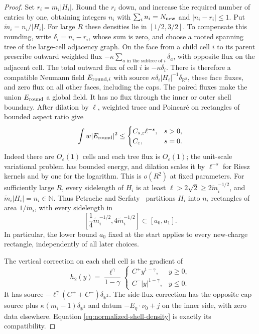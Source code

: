 \begin{proof}
Set $r_i=m_i|H_i|$.  Round the $r_i$ down, and increase the required
number of entries by one, obtaining integers $n_i$ with
$\sum_i n_i=N_{\rm new}$ and $|n_i-r_i|\le1$.
Put $\widetilde m_i=n_i/|H_i|$.  For large $R$ these densities lie
in $[1/2,3/2]$.  To compensate this rounding, write
$\delta_i=n_i-r_i$, whose sum is zero, and choose a rooted spanning
tree of the large-cell adjacency graph.  On the face from a child
cell $i$ to its parent prescribe outward weighted flux
$-\kappa\sum_{a\text{ in the subtree of }i}\delta_a$, with opposite
flux on the adjacent cell.  The total outward flux of cell $i$ is
$-\kappa\delta_i$.  There is therefore a compatible Neumann field
$E_{{\rm round},i}$ with source
$\kappa\delta_i|H_i|^{-1}\delta_{\mathbb R^2}$, these face fluxes,
and zero flux on all other faces, including the caps.
The paired fluxes make the union $E_{\rm round}$ a global field.
It has no flux through the inner or outer shell boundary.
After dilation by $\ell$, weighted trace and Poincar\'e on rectangles
of bounded aspect ratio give
\[
 \int w|E_{\rm round}|^2\le
 \begin{cases}C_{s,\varepsilon}\ell^{-s},&s>0,\\
 C_\varepsilon,&s=0.
 \end{cases}
\]
Indeed there are $O_\varepsilon(1)$ cells and each tree flux is
$O_\varepsilon(1)$; the unit-scale variational problem has bounded
energy, and dilation scales it by $\ell^{-s}$ for Riesz kernels and
by one for the logarithm.  This is $o(R^2)$ at fixed parameters.
For sufficiently large $R$, every sidelength of $H_i$ is at least
$\ell>2\sqrt2\ge2\widetilde m_i^{-1/2}$, and
$\widetilde m_i|H_i|=n_i\in\mathbb N$.
Thus Petrache and Serfaty~\citep[Lemma~6.3]{PetracheSerfaty2017} partitions $H_i$ into
$n_i$ rectangles of area $1/\widetilde m_i$, with every sidelength
in
\[
 \left[\frac14\widetilde m_i^{-1/2},
                      4\widetilde m_i^{-1/2}\right]
                  \subset[a_0,a_1].
\]
In particular, the lower bound $a_0$ fixed at the start applies to
every new-charge rectangle, independently of all later choices.

The vertical correction on each shell cell is the gradient of
\[
 h_2(y)=\frac{\ell^\gamma}{1-\gamma}
 \begin{cases}C^+y^{1-\gamma},&y\ge0,\\
 C^-|y|^{1-\gamma},&y\le0.
 \end{cases}
\]
It has source $-\ell^\gamma(C^++C^-)\delta_{\mathbb R^2}$.
The side-flux correction has the opposite cap source plus
$\kappa(m_i-1)\delta_{\mathbb R^2}$ and datum
$-E_\eta\cdot\nu_0+j$ on the
inner side, with zero data elsewhere.  Equation
\eqref{eq:normalized-shell-density} is exactly its compatibility.


\end{proof}
